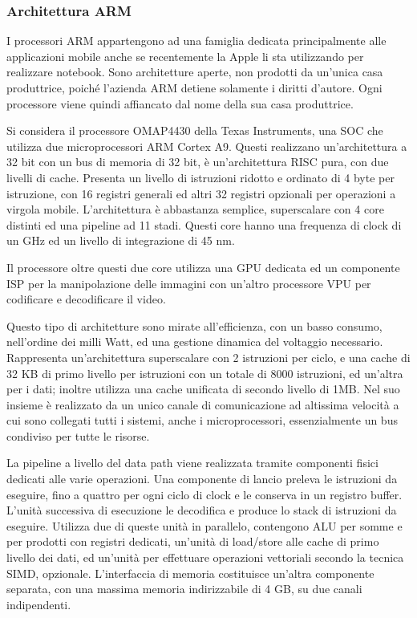 \documentclass{article}
\numberwithin{equation}{subsection}
\begin{document}
\subsubsection{Architettura ARM}
\label{sec:arm}
I processori ARM appartengono ad una famiglia dedicata principalmente alle applicazioni mobile anche se recentemente la Apple li sta utilizzando per realizzare notebook. Sono architetture 
aperte, non prodotti da un'unica casa produttrice, poiché l'azienda ARM detiene solamente i diritti d'autore. Ogni processore viene quindi affiancato dal nome della sua casa produttrice. 

Si considera il processore OMAP4430 della Texas Instruments, una SOC che utilizza due microprocessori ARM Cortex A9. Questi realizzano un'architettura a 32 bit con un bus di 
memoria di 32 bit, è un'architettura RISC pura, con due livelli di cache. Presenta un livello di istruzioni ridotto e ordinato di 4 byte per istruzione, con 16 registri generali ed altri 32 
registri opzionali per operazioni a virgola mobile. L'architettura è abbastanza semplice, superscalare con 4 core distinti ed una pipeline ad 11 stadi. 
Questi core hanno una frequenza di clock di un GHz ed un livello di integrazione di 45 nm. 

Il processore oltre questi due core utilizza una GPU dedicata ed un componente ISP per la manipolazione delle immagini con un'altro processore VPU per codificare e decodificare il video. 

Questo tipo di architetture sono mirate all'efficienza, con un basso consumo, nell'ordine dei milli Watt, ed una gestione dinamica del voltaggio necessario. 
Rappresenta un'architettura superscalare con 2 istruzioni per ciclo, e una cache di 32 KB di primo livello per istruzioni con un totale di 8000 istruzioni, ed un'altra per i dati; inoltre 
utilizza una cache unificata di secondo livello di 1MB. 
Nel suo insieme è realizzato da un unico canale di comunicazione ad altissima velocità a cui sono collegati tutti i sistemi, anche i microprocessori, essenzialmente un bus condiviso per 
tutte le risorse. 

La pipeline a livello del data path viene realizzata tramite componenti fisici dedicati alle varie operazioni. Una componente di lancio preleva le istruzioni da eseguire, fino a quattro 
per ogni ciclo di clock e le conserva in un registro buffer. L'unità successiva di esecuzione le decodifica e produce lo stack di istruzioni da eseguire. Utilizza due di queste unità in 
parallelo, contengono ALU per somme e per prodotti con registri dedicati, un'unità di load/store alle cache di primo livello dei dati, ed un'unità per effettuare operazioni vettoriali 
secondo la tecnica SIMD, opzionale. 
L'interfaccia di memoria costituisce un'altra componente separata, con una massima memoria indirizzabile di 4 GB, su due canali indipendenti.  
\end{document}
